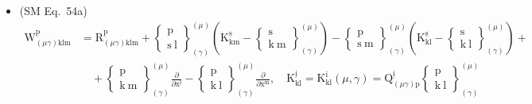 \documentclass[12pt]{article}
\begin{document}
\begin{itemize}[label={},leftmargin=0pt]
    \item (SM Eq.\ 54a) 
    \[
    \begin{aligned}
    \mathrm{W}^{\underline{\mathrm{p}}}_{(\mu\gamma)\mathrm{klm}} &= \mathrm{R}^{\underline{\mathrm{p}}}_{(\mu\gamma)\mathrm{klm}} + \left\{ \begin{smallmatrix} \mathrm{p} \\ \mathrm{s\ l} \end{smallmatrix} \right\}^{(\mu)}_{(\gamma)} \left( \mathrm{K}^{\underline{\mathrm{s}}}_{\mathrm{km}} - \left\{ \begin{smallmatrix} \mathrm{s} \\ \mathrm{k\ m} \end{smallmatrix} \right\}^{(\mu)}_{(\gamma)} \right) - \left\{ \begin{smallmatrix} \mathrm{p} \\ \mathrm{s\ m} \end{smallmatrix} \right\}^{(\mu)}_{(\gamma)} \left( \mathrm{K}^{\underline{\mathrm{s}}}_{\mathrm{kl}} - \left\{ \begin{smallmatrix} \mathrm{s} \\ \mathrm{k\ l} \end{smallmatrix} \right\}^{(\mu)}_{(\gamma)} \right) + \\
    &\quad + \left\{ \begin{smallmatrix} \mathrm{p} \\ \mathrm{k\ m} \end{smallmatrix} \right\}^{(\mu)}_{(\gamma)} \frac{\partial}{\partial \mathrm{x}^{\underline{\mathrm{l}}}} - \left\{ \begin{smallmatrix} \mathrm{p} \\ \mathrm{k\ l} \end{smallmatrix} \right\}^{(\mu)}_{(\gamma)} \frac{\partial}{\partial \mathrm{x}^{\underline{\mathrm{m}}}}, \quad \mathrm{K}^{\underline{\mathrm{i}}}_{\mathrm{kl}} = \mathrm{K}^\mathrm{i}_{\mathrm{kl}}(\mu, \gamma) = \mathrm{Q}^{\underline{\mathrm{i}}}_{(\mu\gamma)\mathrm{p}} \left\{ \begin{smallmatrix} \mathrm{p} \\ \mathrm{k\ l} \end{smallmatrix} \right\}^{(\mu)}_{(\gamma)}
    \end{aligned}
    \]


\end{itemize}
\end{document}
